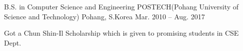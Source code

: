 

\begin{cventries}

  \cventry
    {B.S. in Computer Science and Engineering} %
    {POSTECH(Pohang University of Science and Technology)} %
    {Pohang, S.Korea} %
    {Mar. 2010 -- Aug. 2017} %
    {
      \begin{cvitems} %
        \item {Got a Chun Shin-Il Scholarship which is given to promising students in CSE Dept.}
      \end{cvitems}
    }

\end{cventries}
